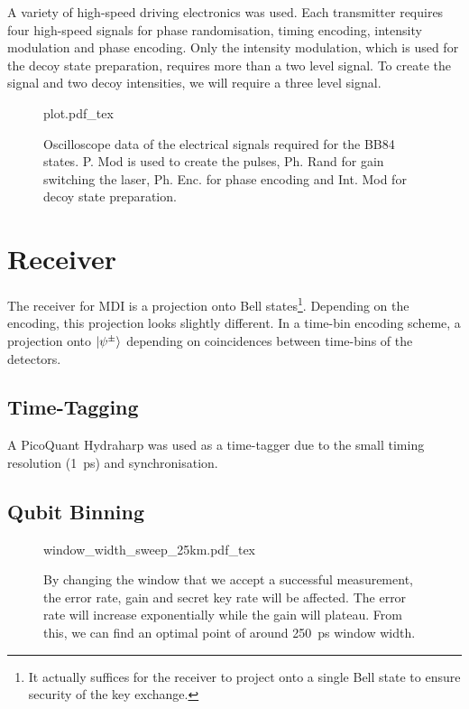 A variety of high-speed driving electronics was used. Each transmitter requires four high-speed signals for phase randomisation, timing encoding, intensity modulation and phase encoding. Only the intensity modulation, which is used for the decoy state preparation, requires more than a two level signal. To create the signal and two decoy intensities, we will require a three level signal. 

\begin{figure}[tbp]
	\centering
	\def\svgwidth{\textwidth} 
	{plot.pdf_tex}
	\caption[Electrical signals for BB84 state generation]{Oscilloscope data of the electrical signals required for the BB84 states. P. Mod is used to create the pulses, Ph. Rand for gain switching the laser, Ph. Enc. for phase encoding and Int. Mod for decoy state preparation.}
	\label{fig:elec_signals}
\end{figure}

\section{Receiver}

The receiver for \ac{MDI} is a projection onto Bell states\footnote{It actually suffices for the receiver to project onto a single Bell state to ensure security of the key exchange.}. Depending on the encoding, this projection looks slightly different. In a time-bin encoding scheme, a projection onto $\ket{\psi^\pm}$ depending on coincidences between time-bins of the detectors.

\subsection{Time-Tagging}

A PicoQuant Hydraharp was used as a time-tagger due to the small timing resolution (\SI{1}{ps}) and synchronisation.

\subsection{Qubit Binning}

\begin{figure}[tbp]
	\centering
	\tiny
	\def\svgwidth{\textwidth} 
	{window_width_sweep_25km.pdf_tex}
	\caption[Qubit window width sweep]{By changing the window that we accept a successful measurement, the error rate, gain and secret key rate will be affected. The error rate will increase exponentially while the gain will plateau. From this, we can find an optimal point of around \SI{250}{\ps} window width.}
	\label{fig:window_sweep}
\end{figure}

